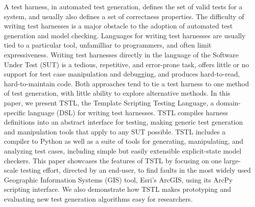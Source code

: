 A test harness, in automated test generation, defines the set of valid tests
for a system, and usually also defines a set of correctness
properties.  The difficulty of writing test harnesses is a major
obstacle to the adoption of automated test generation and model
checking.  Languages for writing test harnesses are usually tied to a
particular tool, unfamilliar to programmers, and often limit
expressiveness.  Writing test harnesses directly in the language of
the Software Under Test (SUT) is a tedious, repetitive, and
error-prone task, offers little or no support for test case
manipulation and debugging, and produces hard-to-read, hard-to-maintain
code.  Both approaches tend to tie a test harness to one method of
test generation, with little ability to explore alternative methods.
In this paper, we present TSTL, the Template Scripting Testing
Language, a domain-specific language (DSL) for writing test harnesses.
TSTL compiles harness definitions into an abstract 
interface for testing, making generic
test generation and manipulation tools that apply to any SUT possible.  TSTL includes a
compiler to Python as well as a suite of tools for generating, manipulating,
and analyzing test cases, including simple but easily extensible explicit-state model
checkers.  This paper showcases the features of TSTL by focusing on
one large-scale testing effort, directed by an end-user, to find
faults in the most widely used Geographic Information Systems (GIS) tool,
Esri's ArcGIS, using its ArcPy scripting interface.  We also
demonstrate how TSTL makes prototyping and evaluating new test
generation algorithms easy for researchers.


